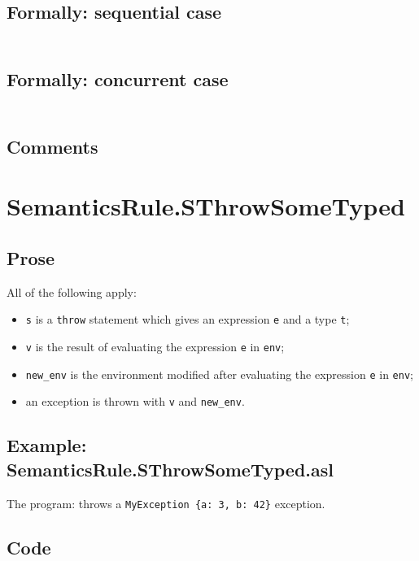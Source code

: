 \documentclass{book}
\begin{document}
  \subsection{Formally: sequential case}
  \begin{align}
  \end{align} 

  \subsection{Formally: concurrent case}
  \begin{align}
  \end{align} 

    \subsection{Comments}

\section{SemanticsRule.SThrowSomeTyped \label{sec:SemanticsRule.SThrowSomeTyped}}

    \subsection{Prose}
    All of the following apply:
    \begin{itemize}
    \item \texttt{s} is a \texttt{throw} statement which gives an expression \texttt{e} and a type \texttt{t};
    \item \texttt{v} is the result of evaluating the expression \texttt{e} in \texttt{env};
    \item \texttt{new\_env} is the environment modified after evaluating the expression \texttt{e} in \texttt{env};
    \item an exception is thrown with \texttt{v} and \texttt{new\_env}.
    \end{itemize}

    \subsection{Example: SemanticsRule.SThrowSomeTyped.asl}
    The program:
    throws a \texttt{MyException \{a: 3, b: 42\}} exception.

  \subsection{Code}
\end{document}
